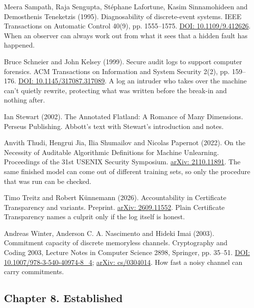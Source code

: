 \documentclass[11pt,twoside]{article}
\theoremstyle{thielethm}
\theoremstyle{thieledef}
\theoremstyle{thieledef}
\theoremstyle{thieledef}
\theoremstyle{thielethm}
\theoremstyle{thieleobs}
\theoremstyle{thielethm}
\begin{document}
\noindent Meera Sampath, Raja Sengupta, St\'ephane Lafortune, Kasim Sinnamohideen and Demosthenis Teneketzis (1995). Diagnosability of discrete-event systems. IEEE Transactions on Automatic Control 40(9), pp. 1555--1575. \href{https://doi.org/10.1109/9.412626}{DOI: 10.1109/9.412626}. When an observer can always work out from what it sees that a hidden fault has happened.
\par\medskip

\noindent Bruce Schneier and John Kelsey (1999). Secure audit logs to support computer forensics. ACM Transactions on Information and System Security 2(2), pp. 159--176. \href{https://doi.org/10.1145/317087.317089}{DOI: 10.1145/317087.317089}. A log an intruder who takes over the machine can't quietly rewrite, protecting what was written before the break-in and nothing after.
\par\medskip

\noindent Ian Stewart (2002). The Annotated Flatland: A Romance of Many Dimensions. Perseus Publishing. Abbott's text with Stewart's introduction and notes.
\par\medskip

\noindent Anvith Thudi, Hengrui Jia, Ilia Shumailov and Nicolas Papernot (2022). On the Necessity of Auditable Algorithmic Definitions for Machine Unlearning. Proceedings of the 31st USENIX Security Symposium. \href{https://arxiv.org/abs/2110.11891}{arXiv: 2110.11891}. The same finished model can come out of different training sets, so only the procedure that was run can be checked.
\par\medskip

\noindent Timo Treitz and Robert K\"unnemann (2026). Accountability in Certificate Transparency and variants. Preprint. \href{https://arxiv.org/abs/2609.11552}{arXiv: 2609.11552}. Plain Certificate Transparency names a culprit only if the log itself is honest.
\par\medskip

\noindent Andreas Winter, Anderson C. A. Nascimento and Hideki Imai (2003). Commitment capacity of discrete memoryless channels. Cryptography and Coding 2003, Lecture Notes in Computer Science 2898, Springer, pp. 35--51. \href{https://doi.org/10.1007/978-3-540-40974-8_4}{DOI: 10.1007/978-3-540-40974-8\_4}; \href{https://arxiv.org/abs/cs/0304014}{arXiv: cs/0304014}. How fast a noisy channel can carry commitments.
\par\medskip

\subsection*{Chapter 8. Established}
\end{document}
